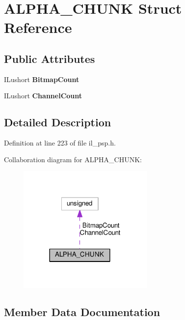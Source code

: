 \hypertarget{structALPHA__CHUNK}{}\section{A\+L\+P\+H\+A\+\_\+\+C\+H\+U\+NK Struct Reference}
\label{structALPHA__CHUNK}
\subsection*{Public Attributes}
\begin{DoxyCompactItemize}
\item 
\mbox{\label{structALPHA__CHUNK_ad1f03e2a68892db0aa1ce3546e0691d6}} 
I\+Lushort {\bfseries Bitmap\+Count}
\item 
\mbox{\label{structALPHA__CHUNK_a41ef694f2c9904553eef013beb5e99b3}} 
I\+Lushort {\bfseries Channel\+Count}
\end{DoxyCompactItemize}


\subsection{Detailed Description}


Definition at line 223 of file il\+\_\+psp.\+h.



Collaboration diagram for A\+L\+P\+H\+A\+\_\+\+C\+H\+U\+NK\+:
\nopagebreak
\begin{figure}[H]
\begin{center}
\leavevmode
\includegraphics[width=189pt]{d2/d53/structALPHA__CHUNK__coll__graph}
\end{center}
\end{figure}


\subsection{Member Data Documentation}
\mbox{\label{structALPHA__CHUNK_ad1f03e2a68892db0aa1ce3546e0691d6}} 
